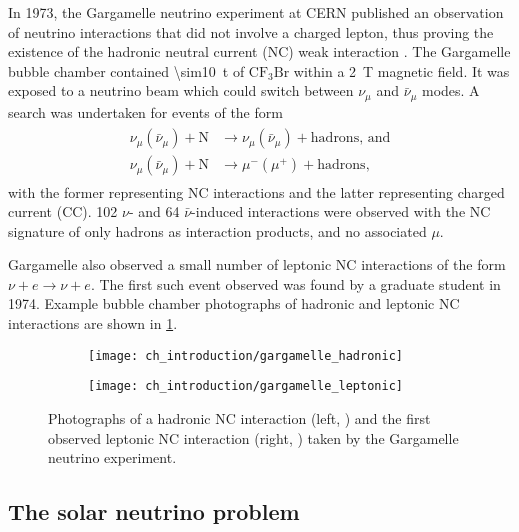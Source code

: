In 1973, the Gargamelle neutrino experiment at CERN
published an observation of neutrino interactions
that did not involve a charged lepton,
thus proving the existence of the hadronic neutral current (NC) weak interaction
\cite{gargamelle_short,gargamelle}.
The Gargamelle bubble chamber contained \SI{\sim10}{\tonne} of
$\text{CF}_3\text{Br}$ within a \SI{2}{\tesla} magnetic field.
It was exposed to a neutrino beam which could switch
between $\nu_\mu$ and $\bar{\nu}_\mu$ modes.
A search was undertaken for events of the form
\begin{align}\label{eq:neutral_current}
    \begin{split}
        \nu_\mu(\bar{\nu}_\mu) + \text{N} &\to \nu_\mu(\bar{\nu}_\mu)
        + \text{hadrons, and} \\
        \nu_\mu(\bar{\nu}_\mu) + \text{N} &\to \mu^-(\mu^+) + \text{hadrons},
    \end{split}
\end{align}
with the former representing NC interactions
and the latter representing charged current (CC).
102 $\nu$- and 64 $\bar{\nu}$-induced interactions were observed
with the NC signature of only hadrons as interaction products,
and no associated $\mu$.

Gargamelle also observed a small number of leptonic NC interactions
of the form $\nu + e \to \nu + e$.
The first such event observed was found by a graduate student
in 1974.
Example bubble chamber photographs of hadronic
and leptonic NC interactions are shown in \cref{fig:gargamelle}.

\begin{figure}
    \centering
    \begin{subfigure}{0.49\textwidth}
        \texttt{[image: ch\_introduction/gargamelle\_hadronic]}
    \end{subfigure}
    \begin{subfigure}{0.49\textwidth}
        \texttt{[image: ch\_introduction/gargamelle\_leptonic]}
    \end{subfigure}
    \caption{
        Photographs of a hadronic NC interaction (left, \cite{gargamelle_leptonic})
        and the first observed leptonic NC interaction (right, \cite{gargamelle})
        taken by the Gargamelle neutrino experiment.
    }
    \label{fig:gargamelle}
\end{figure}

\subsection{The solar neutrino problem}
\label{subsec:homestake}

